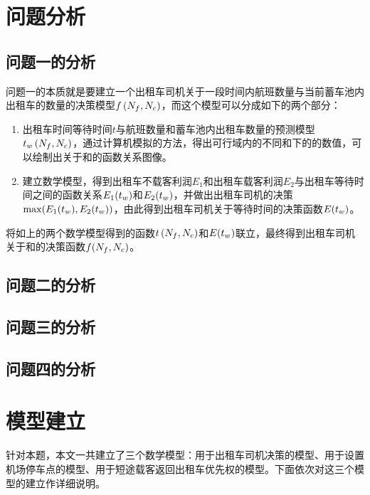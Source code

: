 \documentclass{cumcm}
\begin{document}
\section{问题分析}
\subsection{问题一的分析}
问题一的本质就是要建立一个出租车司机关于一段时间内航班数量\flightnum 与当前蓄车池内出租车的数量\taxinum 的决策模型$f\left(\mbox{$N_f$},\mbox{$N_c$}\right)$，而这个模型可以分成如下的两个部分：
\begin{enumerate}[(1)]
	\item 出租车时间等待时间$t$与航班数量\flightnum 和蓄车池内出租车数量\taxinum 的预测模型$\mbox{$t_w$}\left(\mbox{$N_f$},\mbox{$N_c$}\right)$，通过计算机模拟的方法，得出可行域内的不同\flightnum 和\taxinum 下的\waittime 的数值，可以绘制出\waittime 关于\flightnum 和\taxinum 的函数关系图像。
	\item 建立数学模型，得到出租车不载客利润$E_1$和出租车载客利润$E_2$与出租车等待时间\waittime 之间的函数关系$E_1(\mbox{$t_w$})$和$E_2(\mbox{$t_w$})$，并做出出租车司机的决策$\max(E_1(\mbox{$t_w$}),E_2(\mbox{$t_w$}))$，由此得到出租车司机关于等待时间的决策函数$E(\mbox{$t_w$})$。
\end{enumerate}
\par
将如上的两个数学模型得到的函数$t\left(\mbox{$N_f$},\mbox{$N_c$}\right)$和$E(\mbox{$t_w$})$联立，最终得到出租车司机关于\flightnum 和\taxinum 的决策函数$f(\mbox{$N_f$},\mbox{$N_c$})$。

\subsection{问题二的分析}

\subsection{问题三的分析}

\subsection{问题四的分析}

\section{模型建立}
针对本题，本文一共建立了三个数学模型：用于出租车司机决策的模型、用于设置机场停车点的模型、用于短途载客返回出租车优先权的模型。下面依次对这三个模型的建立作详细说明。
\end{document}
